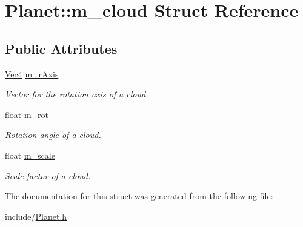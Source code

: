 \hypertarget{structPlanet_1_1m__cloud}{
\section{Planet::m\_\-cloud Struct Reference}
\label{structPlanet_1_1m__cloud}
}
\subsection*{Public Attributes}
\begin{DoxyCompactItemize}
\item 
\hypertarget{structPlanet_1_1m__cloud_aeb5a526eb6ec56aa9348b1ed15afdd53}{
\hyperlink{classVec4}{Vec4} \hyperlink{structPlanet_1_1m__cloud_aeb5a526eb6ec56aa9348b1ed15afdd53}{m\_\-rAxis}}
\label{structPlanet_1_1m__cloud_aeb5a526eb6ec56aa9348b1ed15afdd53}

\begin{DoxyCompactList}\small\item\em Vector for the rotation axis of a cloud. \item\end{DoxyCompactList}\item 
\hypertarget{structPlanet_1_1m__cloud_ab11517f13694c52e38455d102ca48733}{
float \hyperlink{structPlanet_1_1m__cloud_ab11517f13694c52e38455d102ca48733}{m\_\-rot}}
\label{structPlanet_1_1m__cloud_ab11517f13694c52e38455d102ca48733}

\begin{DoxyCompactList}\small\item\em Rotation angle of a cloud. \item\end{DoxyCompactList}\item 
\hypertarget{structPlanet_1_1m__cloud_af086bc9d987f6da393056dc8b65b5dc0}{
float \hyperlink{structPlanet_1_1m__cloud_af086bc9d987f6da393056dc8b65b5dc0}{m\_\-scale}}
\label{structPlanet_1_1m__cloud_af086bc9d987f6da393056dc8b65b5dc0}

\begin{DoxyCompactList}\small\item\em Scale factor of a cloud. \item\end{DoxyCompactList}\end{DoxyCompactItemize}


The documentation for this struct was generated from the following file:\begin{DoxyCompactItemize}
\item 
include/\hyperlink{Planet_8h}{Planet.h}\end{DoxyCompactItemize}
